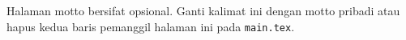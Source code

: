 Halaman motto bersifat opsional. Ganti kalimat ini dengan motto pribadi atau hapus kedua baris pemanggil halaman ini pada \texttt{main.tex}.
